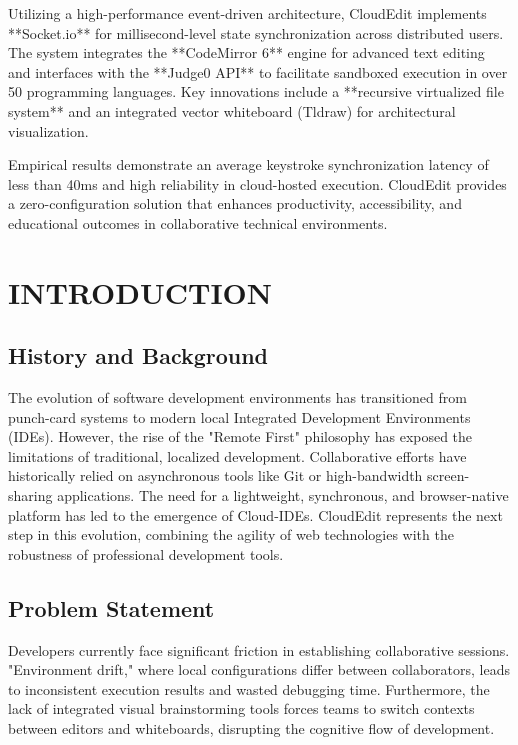 \documentclass[12pt,a4paper]{report}
\begin{document}
Utilizing a high-performance event-driven architecture, CloudEdit implements **Socket.io** for millisecond-level state synchronization across distributed users. The system integrates the **CodeMirror 6** engine for advanced text editing and interfaces with the **Judge0 API** to facilitate sandboxed execution in over 50 programming languages. Key innovations include a **recursive virtualized file system** and an integrated vector whiteboard (Tldraw) for architectural visualization.

Empirical results demonstrate an average keystroke synchronization latency of less than 40ms and high reliability in cloud-hosted execution. CloudEdit provides a zero-configuration solution that enhances productivity, accessibility, and educational outcomes in collaborative technical environments.

\newpage
\tableofcontents
\newpage
\listoffigures
\newpage
\listoftables
\newpage

\clearpage
{}

\chapter{INTRODUCTION}
\section{History and Background}
The evolution of software development environments has transitioned from punch-card systems to modern local Integrated Development Environments (IDEs). However, the rise of the "Remote First" philosophy has exposed the limitations of traditional, localized development. Collaborative efforts have historically relied on asynchronous tools like Git or high-bandwidth screen-sharing applications. The need for a lightweight, synchronous, and browser-native platform has led to the emergence of Cloud-IDEs. CloudEdit represents the next step in this evolution, combining the agility of web technologies with the robustness of professional development tools.

\section{Problem Statement}
Developers currently face significant friction in establishing collaborative sessions. "Environment drift," where local configurations differ between collaborators, leads to inconsistent execution results and wasted debugging time. Furthermore, the lack of integrated visual brainstorming tools forces teams to switch contexts between editors and whiteboards, disrupting the cognitive flow of development.
\end{document}

